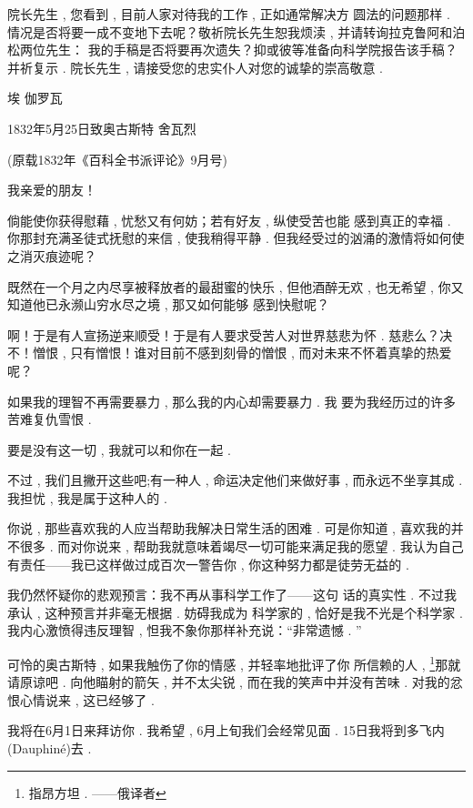 院长先生 , 您看到 , 目前人家对待我的工作 , 正如通常解决方 圆法的问题那样 . 情况是否将要一成不变地下去呢？敬祈院长先生恕我烦渎 , 并请转询拉克鲁阿和泊松两位先生： 我的手稿是否将要再次遗失？抑或彼等准备向科学院报告该手稿？并祈复示 . 院长先生 , 请接受您的忠实仆人对您的诚挚的崇高敬意 . 

\begin{flushright}
	埃 \textbullet 伽罗瓦
\end{flushright}

\begin{center}
	1832年5月25日致奥古斯特 \textbullet 舍瓦烈

(原载1832年《百科全书派评论》9月号)
\end{center}

我亲爱的朋友！

倘能使你获得慰藉 , 忧愁又有何妨；若有好友 , 纵使受苦也能 感到真正的幸福 . 你那封充满圣徒式抚慰的来信 , 使我稍得平静 .  但我经受过的汹涌的激情将如何使之消灭痕迹呢？

既然在一个月之内尽享被释放者的最甜蜜的快乐 , 但他酒醉无欢 , 也无希望 , 你又知道他已永濒山穷水尽之境 , 那又如何能够 感到快慰呢？

啊！于是有人宣扬逆来顺受！于是有人要求受苦人对世界慈悲为怀 . 慈悲么？决不！憎恨 , 只有憎恨！谁对目前不感到刻骨的憎恨 , 而对未来不怀着真挚的热爱呢？

如果我的理智不再需要暴力 , 那么我的内心却需要暴力 . 我 要为我经历过的许多苦难复仇雪恨 . 

要是没有这一切 , 我就可以和你在一起 . 

不过 , 我们且撇开这些吧;有一种人 , 命运决定他们来做好事 , 而永远不坐享其成 . 我担忧 , 我是属于这种人的 . 

你说 , 那些喜欢我的人应当帮助我解决日常生活的困难 . 可是你知道 , 喜欢我的并不很多 . 而对你说来 , 帮助我就意味着竭尽一切可能来满足我的愿望 . 我认为自己有责任——我已这样做过成百次一警告你 , 你这种努力都是徒劳无益的 . 

我仍然怀疑你的悲观预言：我不再从事科学工作了——这句 话的真实性 . 不过我承认 , 这种预言并非毫无根据 . 妨碍我成为 科学家的 , 恰好是我不光是个科学家 . 我内心激愤得违反理智 , 怛我不象你那样补充说：“非常遗憾 . ”

可怜的奥古斯特 , 如果我触伤了你的情感 , 并轻率地批评了你 所信赖的人 , \footnote{指昂方坦 . ——俄译者}那就请原谅吧 . 向他瞄射的箭矢 , 并不太尖锐 , 而在我的笑声中并没有苦味 . 对我的忿恨心情说来 , 这已经够了 . 

我将在6月1日来拜访你 . 我希望 , 6月上旬我们会经常见面 . 15日我将到多飞内(Dauphiné)去 . 

